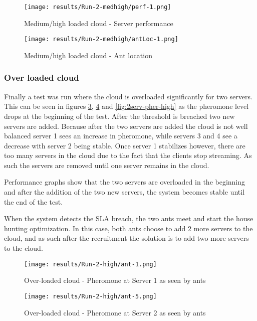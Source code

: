 \begin{figure}
	\centering
		\texttt{[image: results/Run-2-medhigh/perf-1.png]}
	\caption{Medium/high loaded cloud - Server performance}
	\label{fig:2serv-perf-medhigh}
\end{figure}

\begin{figure}
	\centering
		\texttt{[image: results/Run-2-medhigh/antLoc-1.png]}
	\caption{Medium/high loaded cloud - Ant location}
	\label{fig:2serv-antloc-medhigh}
\end{figure}

\subsubsection{Over loaded cloud}

Finally a test was run where the cloud is overloaded significantly for two servers. This can be seen in figures \ref{fig:2serv-ant1-high}, \ref{fig:2serv-ant5-high} and \ref{fig:2serv-pher-high} as the pheromone level drops at the beginning of the test. After the threshold is breached two new servers are added. Because after the two servers are added the cloud is not well balanced server 1 sees an increase in pheromone, while servers 3 and 4 see a decrease with server 2 being stable. Once server 1 stabilizes however, there are too many servers in the cloud due to the fact that the clients stop streaming. As such the servers are removed until one server remains in the cloud.

Performance graphs show that the two servers are overloaded in the beginning and after the addition of the two new servers, the system becomes stable until the end of the test.

When the system detects the SLA breach, the two ants meet and start the house hunting optimization. In this case, both ants choose to add 2 more servers to the cloud, and as such after the recruitment the solution is to add two more servers to the cloud.

\begin{figure}[!ht]
	\centering
		\texttt{[image: results/Run-2-high/ant-1.png]}
	\caption{Over-loaded cloud - Pheromone at Server 1 as seen by ants}
	\label{fig:2serv-ant1-high}
\end{figure}

\begin{figure}
	\centering
		\texttt{[image: results/Run-2-high/ant-5.png]}
	\caption{Over-loaded cloud - Pheromone at Server 2 as seen by ants}
	\label{fig:2serv-ant5-high}
\end{figure}


